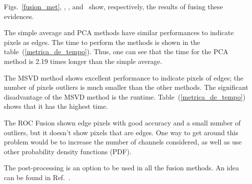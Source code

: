 \documentclass[journal]{IEEEtran}
\begin{document}
Figs.~\ref{fusion_met}, , , and~ show, respectively, the results of fusing these evidences. 

The simple average and PCA methods have similar performances to indicate pixels as edges. The time to perform the methods is shown in the table~(\ref{metrica_de_tempo}). Thus, one can see that the time for the PCA method is 2.19 times longer than the simple average.  

The MSVD method shows excellent performance to indicate pixels of edges; the number of pixels outliers is much smaller than the other methods. The significant disadvantage of the MSVD method is the runtime. Table~(\ref{metrica_de_tempo}) shows that it has the highest time.

The ROC Fusion shown edge pixels with good accuracy and a small number of outliers, but it doesn't show pixels that are edges. One way to get around this problem would be to increase the number of channels considered, as well as use other probability density functions (PDF).

The post-processing is an option to be used in all the fusion methods. An idea can be found in Ref.~\cite{gmbf}. 
\end{document}
